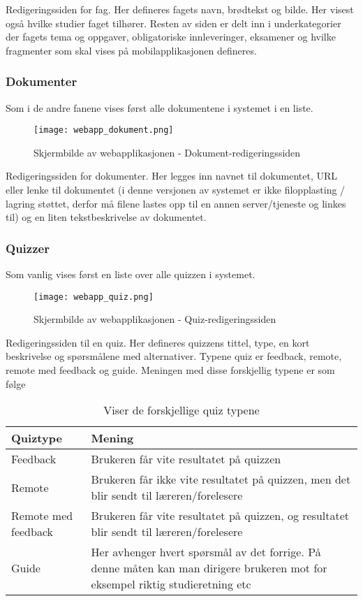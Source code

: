 \documentclass[../main.tex]{subfiles}
\begin{document}
Redigeringssiden for fag. Her defineres fagets navn, brødtekst og bilde. Her visest også hvilke studier faget tilhører. Resten av siden er delt inn i underkategorier der fagets tema og oppgaver, obligatoriske innleveringer, eksamener og hvilke fragmenter som skal vises på mobilapplikasjonen defineres.

\subsubsection{Dokumenter}
Som i de andre fanene vises først alle dokumentene i systemet i en liste.

\begin{figure}[H]
  \centering
  \texttt{[image: webapp\_dokument.png]}
  \caption{Skjermbilde av webapplikasjonen - Dokument-redigeringssiden}
\end{figure}

Redigeringssiden for dokumenter. Her legges inn navnet til dokumentet, URL eller lenke til dokumentet (i denne versjonen av systemet er ikke filopplasting / lagring støttet, derfor må filene lastes opp til en annen server/tjeneste og linkes til) og en liten tekstbeskrivelse av dokumentet.

\subsubsection{Quizzer}

Som vanlig vises først en liste over alle quizzen i systemet.

\begin{figure}[H]
  \centering
  \texttt{[image: webapp\_quiz.png]}
  \caption{Skjermbilde av webapplikasjonen - Quiz-redigeringssiden}
\end{figure}

Redigeringssiden til en quiz. Her defineres quizzens tittel, type, en kort beskrivelse og spørsmålene med alternativer. Typene quiz er feedback, remote, remote med feedback og guide. Meningen med disse forskjellig typene er som følge

\begin{table}[H]
\begin{center}
\caption{Viser de forskjellige quiz typene}
  \begin{tabular}{ | p{5cm} | p{8cm} |}
    \hline
    Quiztype & Mening \\ \hline
    Feedback & Brukeren får vite resultatet på quizzen \\ \hline
    Remote & Brukeren får ikke vite resultatet på quizzen, men det blir sendt til læreren/forelesere \\ \hline
    Remote med feedback & Brukeren får vite resultatet på quizzen, og resultatet blir sendt til læreren/forelesere \\ \hline
    Guide & Her avhenger hvert spørsmål av det forrige. På denne måten kan man dirigere brukeren mot for eksempel riktig studieretning etc \\
    \hline
  \end{tabular}
\end{center}
\end{table}
\end{document}
